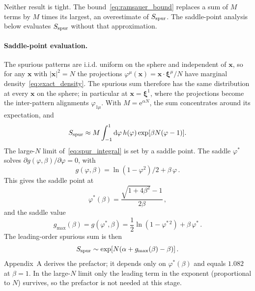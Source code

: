\documentclass[letterpaper]{article} %
\newcommand{\bxi}{\boldsymbol{\xi}}
\newcommand{\bx}{\bm{x}}
\newcommand{\e}{{\mathrm{e}}}
\newcommand{\dd}{{\mathrm{d}}}
\newcommand{\Bnet}{\beta}
\newcommand{\p}{\partial}
\begin{document}
Neither result is tight.  The bound~\eqref{eq:ramsauer_bound}
replaces a sum of $M$ terms by $M$ times its largest, an
overestimate of $S_{\rm spur}$.  The saddle-point analysis below
evaluates $S_{\rm spur}$ without that approximation.

\paragraph{Saddle-point evaluation.}
The spurious patterns are i.i.d. uniform on the sphere and independent of $\bx$,
so for any $\bx$ with $|\bx|^2 = N$ the projections
$\varphi^\mu(\bx) = \bx \cdot \bxi^\mu / N$ have marginal
density~\eqref{eq:exact_density}. The spurious sum therefore has the same
distribution at every $\bx$ on the sphere; in particular at $\bx = \bxi^1$, where
the projections become the inter-pattern alignments $\varphi_{1\mu}$. With
$M = \e^{\alpha N}$, the sum concentrates around its expectation, and
\begin{equation}
    S_{\rm spur} \approx M \int_{-1}^{1} \dd\varphi\, h(\varphi) \exp[\Bnet N(\varphi - 1)].
    \label{eq:spur_integral}
\end{equation}
The large-$N$ limit of~\eqref{eq:spur_integral} is set by a saddle point. The
saddle $\varphi^*$ solves $\p g(\varphi, \Bnet)/\p\varphi = 0$, with
\begin{equation}
    g(\varphi, \Bnet) = \ln(1-\varphi^2)/2 + \Bnet\,\varphi\,.
\end{equation}
This gives the saddle point at
\begin{equation}
\varphi^*(\Bnet) = \frac{\sqrt{1+4\Bnet^2} - 1}{2\Bnet}\,,
\label{eq:saddle}
\end{equation}
and the saddle value
\begin{equation}
g_{\max}(\Bnet) = g(\varphi^*, \Bnet) = \frac12 \ln(1 - \varphi^{*\,2}) + \Bnet\,\varphi^*\,.
\label{eq:saddle_value}
\end{equation}
The leading-order spurious sum is then
\begin{equation}
    S_{\rm spur} \sim \exp[N(\alpha + g_{\max}(\Bnet) - \Bnet)]\,.
    \label{eq:spurious_saddle}
\end{equation}
Appendix~A derives the prefactor; it depends only on $\varphi^*(\Bnet)$ and equals
$1.082$ at $\Bnet = 1$. In the large-$N$ limit only the leading term in the
exponent (proportional to $N$) survives, so the prefactor is not needed at this
stage.
\end{document}

